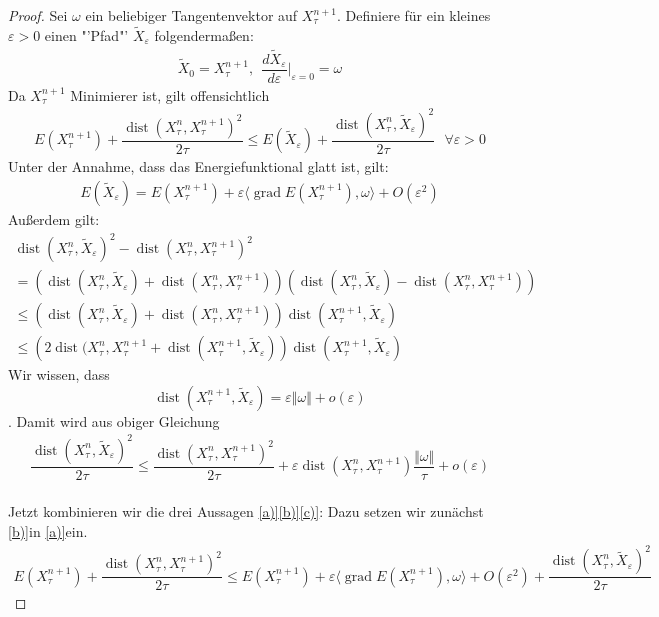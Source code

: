 \documentclass[11pt,a4paper,notitlepage]{scrreprt}
\newcommand{\dist}{\operatorname{dist}}
\newcommand{\grad}{\operatorname{grad}}
\begin{document}
\begin{proof}
Sei $\omega$ ein beliebiger Tangentenvektor auf $X_\tau^{n+1}$. Definiere für ein kleines $\varepsilon>0$ einen "'Pfad"' $\tilde{X}_\varepsilon$ folgendermaßen:\\
\begin{eqnarray}
\tilde{X}_0=X_\tau^{n+1},~~\dfrac{d\tilde{X}_\varepsilon}{d\varepsilon}\Bigg|_{\varepsilon=0} =\omega
\end{eqnarray}
Da $X_\tau^{n+1}$ Minimierer ist, gilt offensichtlich
\begin{eqnarray}
E(X_\tau^{n+1})+\dfrac{\dist(X_\tau^n,X_\tau^{n+1})^2}{2\tau}\leq E(\tilde{X}_\varepsilon)+\dfrac{\dist(X_\tau^n,\tilde{X}_\varepsilon)^2}{2\tau}~~~\forall \varepsilon>0 \label{a)}
\end{eqnarray}
Unter der Annahme, dass das Energiefunktional glatt ist, gilt:
\begin{eqnarray}
E(\tilde{X}_\varepsilon)=E(X_\tau^{n+1})+\varepsilon\langle \grad E(X_\tau^{n+1}),\omega\rangle+O(\varepsilon^2) \label{b)}
\end{eqnarray}
Außerdem gilt:
\begin{align*}
\dist (X_\tau^n,\tilde{X}_\varepsilon)^2-\dist(X_\tau^n,X_\tau^{n+1})^2\\
=\left(\dist(X_\tau^n,\tilde{X}_\varepsilon)+\dist(X_\tau^n,X_\tau^{n+1})\right)\left(\dist(X_\tau^n,\tilde{X}_\varepsilon)-\dist(X_\tau^n,X_\tau^{n+1})\right)\\
\leq \left(\dist(X_\tau^n,\tilde{X}_\varepsilon)+\dist(X_\tau^n,X_\tau^{n+1})\right)\dist(X_\tau^{n+1},\tilde{X}_\varepsilon) \\
\leq\left(2\dist(X_\tau^n,X_\tau^{n+1}+\dist(X_\tau^{n+1},\tilde{X}_\varepsilon)\right)\dist(X_\tau^{n+1},\tilde{X}_\varepsilon)
\end{align*}
Wir wissen, dass \[\dist(X_\tau^{n+1},\tilde{X}_\varepsilon)=\varepsilon\Vert \omega \Vert + o(\varepsilon) \].
Damit wird aus obiger Gleichung
\begin{eqnarray}
\dfrac{\dist(X_\tau^n,\tilde{X}_\varepsilon)^2}{2\tau}\leq \dfrac{\dist(X_\tau^n,X_\tau^{n+1})^2}{2\tau}+\varepsilon\dist(X_\tau^n,X_\tau^{n+1})\dfrac{\Vert \omega \Vert}{\tau} + o(\varepsilon) \label{c)}
\end{eqnarray}
\\
Jetzt kombinieren wir die drei Aussagen \ref{a)}\ref{b)}\ref{c)}: Dazu setzen wir zunächst \ref{b)}in \ref{a)}ein.
\begin{align*}
E(X_\tau^{n+1})+\dfrac{\dist(X_\tau^n,X_\tau^{n+1})^2}{2\tau}\leq E(X_\tau^{n+1})+\varepsilon\langle \grad E(X_\tau^{n+1}),\omega\rangle+O(\varepsilon^2)+\dfrac{\dist(X_\tau^n,\tilde{X}_\varepsilon)^2}{2\tau}

\end{align*}
\end{proof}
\end{document}
